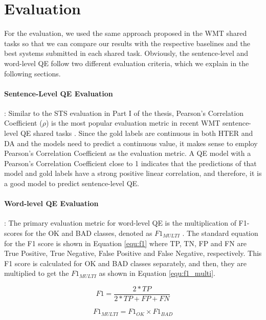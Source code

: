 \section{Evaluation}
\label{sec:qe_evaluation}
For the evaluation, we used the same approach proposed in the WMT shared tasks so that we can compare our results with the respective baselines and the best systems submitted in each shared task. Obviously, the sentence-level and word-level QE follow two different evaluation criteria, which we explain in the following sections. 

\paragraph{Sentence-Level QE Evaluation} : Similar to the STS evaluation in Part I of the thesis, Pearson's Correlation Coefficient ($\rho$) is the most popular evaluation metric in recent WMT sentence-level QE shared tasks \autocite{specia-etal-2018-findings,fonseca-etal-2019-findings,specia-etal-2020-findings-wmt}. Since the gold labels are continuous in both HTER and DA and the models need to predict a continuous value, it makes sense to employ Pearson's Correlation Coefficient as the evaluation metric. A QE model with a Pearson's Correlation Coefficient close to 1 indicates that the predictions of that model and gold labels have a strong positive linear correlation, and therefore, it is a good model to predict sentence-level QE.  


\paragraph{Word-level QE Evaluation} : The primary evaluation metric for word-level QE is the multiplication of F1-scores for the OK and BAD classes, denoted as $F1_{\textit{MULTI}}$ \autocite{specia-etal-2018-findings,fonseca-etal-2019-findings,specia-etal-2020-findings-wmt}. The standard equation for the F1 score is shown in Equation \ref{equ:f1} where TP, TN, FP and FN are True Positive, True Negative, False Positive and False Negative, respectively. This F1 score is calculated for OK and BAD classes separately, and then, they are multiplied to get the $F1_{\textit{MULTI}}$ as shown in Equation \ref{equ:f1_multi}. 

\begin{equation}
\label{equ:f1}
	F1 = \frac{2*TP}{2*TP+FP+FN}
\end{equation}


\begin{equation}
	\label{equ:f1_multi}
	F1_{\textit{MULTI}} = F1_{\textit{OK}} \times F1_{\textit{BAD}}
\end{equation}

